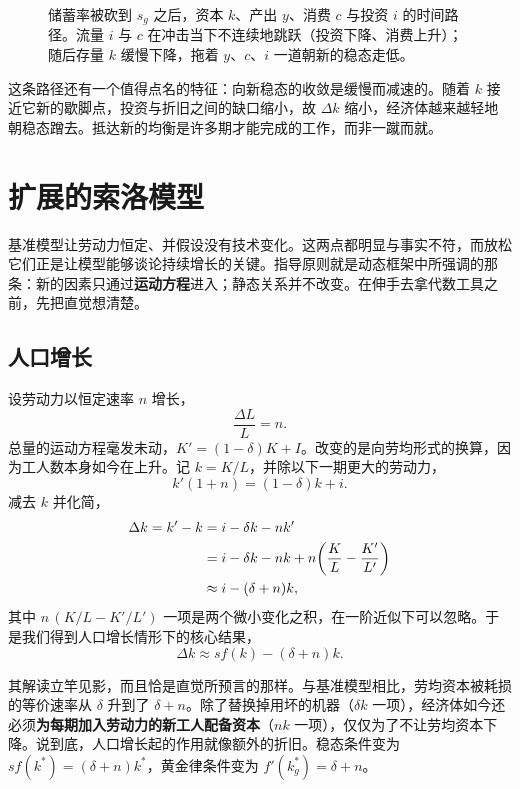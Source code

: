 \begin{figure}[h]
\centering

\caption{储蓄率被砍到 $s_g$ 之后，资本 $k$、产出 $y$、消费 $c$ 与投资 $i$ 的时间路径。流量 $i$ 与 $c$ 在冲击当下不连续地跳跃（投资下降、消费上升）；随后存量 $k$ 缓慢下降，拖着 $y$、$c$、$i$ 一道朝新的稳态走低。}
\label{fig:macro-4}
\end{figure}

这条路径还有一个值得点名的特征：向新稳态的收敛是缓慢而减速的。随着 $k$ 接近它新的歇脚点，投资与折旧之间的缺口缩小，故 $\Delta k$ 缩小，经济体越来越轻地朝稳态蹭去。抵达新的均衡是许多期才能完成的工作，而非一蹴而就。

\section{扩展的索洛模型}

基准模型让劳动力恒定、并假设没有技术变化。这两点都明显与事实不符，而放松它们正是让模型能够谈论持续增长的关键。指导原则就是动态框架中所强调的那条：新的因素只通过\textbf{运动方程}进入；静态关系并不改变。在伸手去拿代数工具之前，先把直觉想清楚。

\subsection{人口增长}

设劳动力以恒定速率 $n$ 增长，
\[
\frac{\Delta L}{L} = n.
\]
总量的运动方程毫发未动，$K' = (1-\delta) K + I$。改变的是向劳均形式的换算，因为工人数本身如今在上升。记 $k = K/L$，并除以下一期更大的劳动力，
\[
k'(1 + n) = (1-\delta) k + i.
\]
减去 $k$ 并化简，
\[
\begin{aligned}
\Delta k = k' - k
&= i - \delta k - n k' \\
&= i - \delta k - n k + n\!\left(\frac{K}{L} - \frac{K'}{L'}\right) \\
&\approx i - (\delta + n) k,
\end{aligned}
\]
其中 $n\,(K/L - K'/L')$ 一项是两个微小变化之积，在一阶近似下可以忽略。于是我们得到人口增长情形下的核心结果，
\begin{equation}
\Delta k \approx s f(k) - (\delta + n) k.
\label{eq:solow-popn}
\end{equation}

其解读立竿见影，而且恰是直觉所预言的那样。与基准模型相比，劳均资本被耗损的等价速率从 $\delta$ 升到了 $\delta + n$。除了替换掉用坏的机器（$\delta k$ 一项），经济体如今还必须\textbf{为每期加入劳动力的新工人配备资本}（$n k$ 一项），仅仅为了不让劳均资本下降。说到底，人口增长起的作用就像额外的折旧。稳态条件变为 $s f(k^*) = (\delta + n) k^*$，黄金律条件变为 $f'(k_g^*) = \delta + n$。


